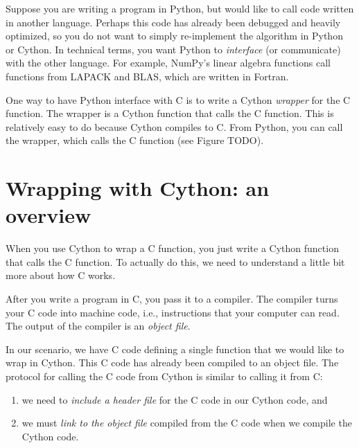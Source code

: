 \newcommand{\of}{\texttt{.o}~}

\label{lab:cythonwrap}


Suppose you are writing a program in Python, but would like to call code written in another language.
Perhaps this code has already been debugged and heavily optimized, so you do not want to simply re-implement the algorithm in Python or Cython.
In technical terms, you want Python to \emph{interface} (or communicate) with the other language.
For example, NumPy's linear algebra functions call functions from LAPACK and BLAS, which are written in Fortran.

One way to have Python interface with C is to write a Cython \emph{wrapper} for the C function.
The wrapper is a Cython function that calls the C function. 
This is relatively easy to do because Cython compiles to C.
From Python, you can call the wrapper, which calls the C function (see Figure TODO).


\section*{Wrapping with Cython: an overview}
When you use Cython to wrap a C function, you just write a Cython function that calls the C function.
To actually do this, we need to understand a little bit more about how C works.

After you write a program in C, you pass it to a compiler.
The compiler turns your C code into machine code, i.e., instructions that your computer can read.
The output of the compiler is an \emph{object file}.

In our scenario, we have C code defining a single function that we would like to wrap in Cython.
This C code has already been compiled to an object file.
The protocol for calling the C code from Cython is similar to calling it from C:
\begin{enumerate}
\item we need to \emph{include a header file} for the C code in our Cython code, and
\item we must \emph{link to the object file} compiled from the C code when we compile the Cython code.
\end{enumerate}

